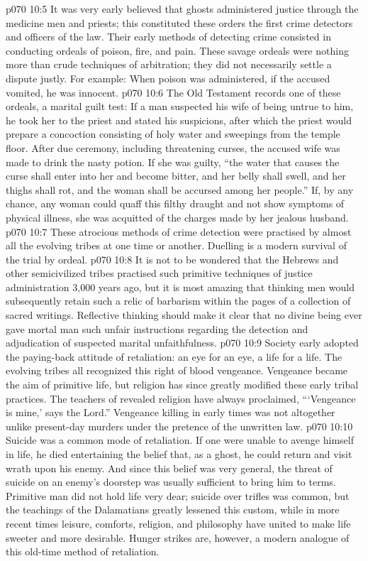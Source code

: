 \vs p070 10:5 It was very early believed that ghosts administered justice through the medicine men and priests; this constituted these orders the first crime detectors and officers of the law. Their early methods of detecting crime consisted in conducting ordeals of poison, fire, and pain. These savage ordeals were nothing more than crude techniques of arbitration; they did not necessarily settle a dispute justly. For example: When poison was administered, if the accused vomited, he was innocent.
\vs p070 10:6 The Old Testament records one of these ordeals, a marital guilt test: If a man suspected his wife of being untrue to him, he took her to the priest and stated his suspicions, after which the priest would prepare a concoction consisting of holy water and sweepings from the temple floor. After due ceremony, including threatening curses, the accused wife was made to drink the nasty potion. If she was guilty, “the water that causes the curse shall enter into her and become bitter, and her belly shall swell, and her thighs shall rot, and the woman shall be accursed among her people.” If, by any chance, any woman could quaff this filthy draught and not show symptoms of physical illness, she was acquitted of the charges made by her jealous husband.
\vs p070 10:7 These atrocious methods of crime detection were practised by almost all the evolving tribes at one time or another. Duelling is a modern survival of the trial by ordeal.
\vs p070 10:8 It is not to be wondered that the Hebrews and other semicivilized tribes practised such primitive techniques of justice administration 3,000 years ago, but it is most amazing that thinking men would subsequently retain such a relic of barbarism within the pages of a collection of sacred writings. Reflective thinking should make it clear that no divine being ever gave mortal man such unfair instructions regarding the detection and adjudication of suspected marital unfaithfulness.
\vs p070 10:9 \pc Society early adopted the paying\hyp{}back attitude of retaliation: an eye for an eye, a life for a life. The evolving tribes all recognized this right of blood vengeance. Vengeance became the aim of primitive life, but religion has since greatly modified these early tribal practices. The teachers of revealed religion have always proclaimed, “‘Vengeance is mine,’ says the Lord.” Vengeance killing in early times was not altogether unlike present\hyp{}day murders under the pretence of the unwritten law.
\vs p070 10:10 Suicide was a common mode of retaliation. If one were unable to avenge himself in life, he died entertaining the belief that, as a ghost, he could return and visit wrath upon his enemy. And since this belief was very general, the threat of suicide on an enemy’s doorstep was usually sufficient to bring him to terms. Primitive man did not hold life very dear; suicide over trifles was common, but the teachings of the Dalamatians greatly lessened this custom, while in more recent times leisure, comforts, religion, and philosophy have united to make life sweeter and more desirable. Hunger strikes are, however, a modern analogue of this old\hyp{}time method of retaliation.
